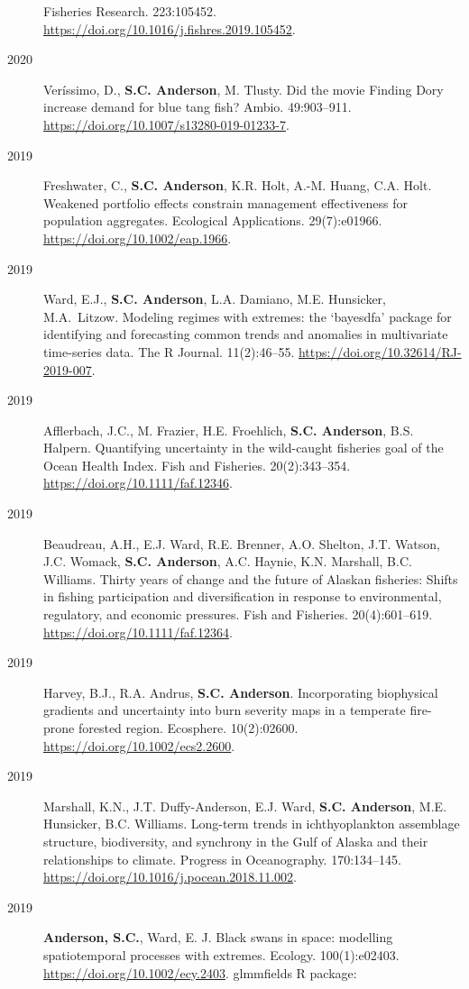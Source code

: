 \begin{description}
Fisheries Research. 223:105452.
\url{https://doi.org/10.1016/j.fishres.2019.105452}.
\item[2020]
Veríssimo, D., \textbf{S.C. Anderson}, M. Tlusty. Did the movie Finding
Dory increase demand for blue tang fish? Ambio. 49:903--911.
\url{https://doi.org/10.1007/s13280-019-01233-7}.
\item[2019]
Freshwater, C., \textbf{S.C. Anderson}, K.R. Holt, A.-M. Huang, C.A.
Holt. Weakened portfolio effects constrain management effectiveness for
population aggregates. Ecological Applications. 29(7):e01966.
\url{https://doi.org/10.1002/eap.1966}.
\item[2019]
Ward, E.J., \textbf{S.C. Anderson}, L.A. Damiano, M.E. Hunsicker,
M.A.\ Litzow. Modeling regimes with extremes: the `bayesdfa' package for
identifying and forecasting common trends and anomalies in multivariate
time-series data. The R Journal. 11(2):46--55.
\url{https://doi.org/10.32614/RJ-2019-007}.
\item[2019]
Afflerbach, J.C., M. Frazier, H.E. Froehlich, \textbf{S.C. Anderson},
B.S. Halpern. Quantifying uncertainty in the wild-caught fisheries goal
of the Ocean Health Index. Fish and Fisheries. 20(2):343--354.
\url{https://doi.org/10.1111/faf.12346}.
\item[2019]
Beaudreau, A.H., E.J. Ward, R.E. Brenner, A.O. Shelton, J.T. Watson,
J.C. Womack, \textbf{S.C. Anderson}, A.C. Haynie, K.N. Marshall, B.C.
Williams. Thirty years of change and the future of Alaskan fisheries:
Shifts in fishing participation and diversification in response to
environmental, regulatory, and economic pressures. Fish and Fisheries.
20(4):601--619. \url{https://doi.org/10.1111/faf.12364}.
\item[2019]
Harvey, B.J., R.A. Andrus, \textbf{S.C. Anderson}. Incorporating
biophysical gradients and uncertainty into burn severity maps in a
temperate fire-prone forested region. Ecosphere. 10(2):02600.
\url{https://doi.org/10.1002/ecs2.2600}.
\item[2019]
Marshall, K.N., J.T. Duffy-Anderson, E.J. Ward, \textbf{S.C. Anderson},
M.E. Hunsicker, B.C. Williams. Long-term trends in ichthyoplankton
assemblage structure, biodiversity, and synchrony in the Gulf of Alaska
and their relationships to climate. Progress in Oceanography.
170:134--145. \url{https://doi.org/10.1016/j.pocean.2018.11.002}.
\item[2019]
\textbf{Anderson, S.C.}, Ward, E. J. Black swans in space: modelling
spatiotemporal processes with extremes. Ecology. 100(1):e02403.
\url{https://doi.org/10.1002/ecy.2403}. glmmfields R package:

\end{description}
